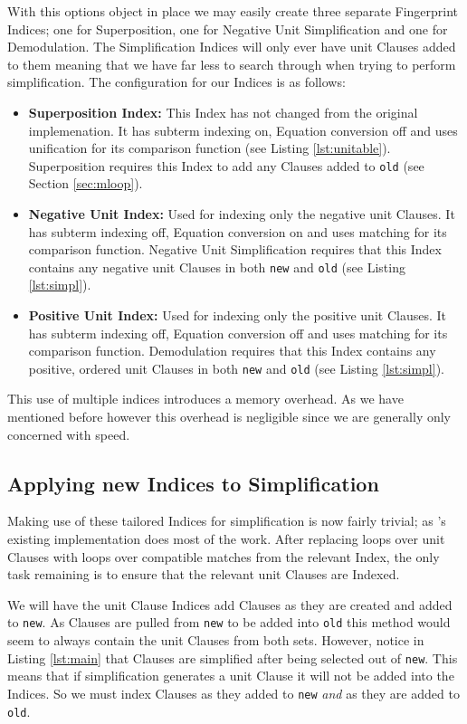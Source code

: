 With this options object in place we may easily create three separate
Fingerprint Indices; one for Superposition, one for Negative Unit Simplification and
one for Demodulation. The Simplification Indices will only ever have unit Clauses
added to them meaning that we have far less to search through when trying to perform
simplification. The configuration for our Indices is as follows:
\begin{itemize}
\item \textbf{Superposition Index:} This Index has not changed from the original
implemenation. It has subterm indexing on, Equation conversion off and uses
unification for its comparison function (see Listing \ref{lst:unitable}).
Superposition requires this Index to add any Clauses added to \verb!old!
(see Section \ref{sec:mloop}).
\item \textbf{Negative Unit Index:} Used for indexing only the negative
unit Clauses. It has subterm indexing off, Equation conversion on and uses
matching for its comparison function. Negative Unit Simplification requires
that this Index contains any negative unit Clauses in both \verb!new! and \verb!old!
(see Listing \ref{lst:simpl}).
\item \textbf{Positive Unit Index:} Used for indexing only the positive
unit Clauses. It has subterm indexing off, Equation conversion off and uses
matching for its comparison function. Demodulation requires
that this Index contains any positive, ordered unit Clauses in both \verb!new! and \verb!old!
(see Listing \ref{lst:simpl}).
\end{itemize}

This use of multiple indices introduces a memory overhead. As we have mentioned
before however this overhead is negligible since we are generally only concerned
with speed.

\subsection{Applying new Indices to Simplification}

Making use of these tailored Indices for simplification is now fairly trivial;
as \beagle's existing implementation does most of the work. After replacing
loops over unit Clauses with loops over compatible matches from the relevant Index, the
only task remaining is to ensure that the relevant unit Clauses are Indexed.

We will have the unit Clause Indices add Clauses as they are created and added
to \verb!new!. As Clauses are pulled from \verb!new! to be added into \verb!old!
this method would seem to always contain the unit Clauses from both sets.
However, notice in Listing \ref{lst:main} that Clauses are simplified after being
selected out of \verb!new!. This means that if simplification generates a unit
Clause it will not be added into the Indices. So we must index Clauses as they
added to \verb!new! \emph{and} as they are added to \verb!old!.

